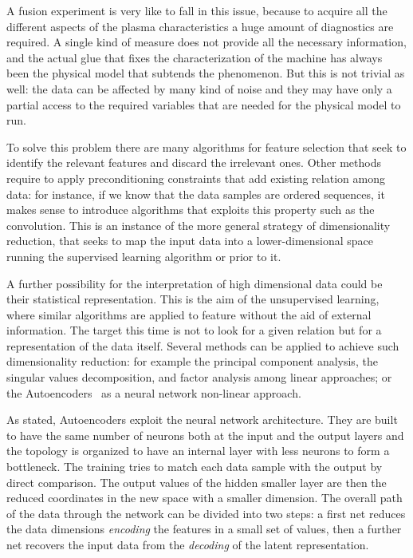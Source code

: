 A fusion experiment is very like to fall in this issue, because to acquire all the different aspects of the plasma characteristics a huge amount of diagnostics are required. A single kind of measure does not provide all the necessary information, and the actual glue that fixes the characterization of the machine has always been the physical model that subtends the phenomenon.
But this is not trivial as well: the data can be affected by many kind of noise and they may have only a partial access to the required variables that are needed for the physical model to run.

To solve this problem there are many algorithms for feature selection that seek to identify the relevant features and discard the irrelevant ones. 
Other methods require to apply preconditioning constraints that add existing relation among data: for instance, if we know that the data samples are ordered sequences, it makes sense to introduce algorithms that exploits this property such as the convolution.
This is an instance of the more general strategy of dimensionality reduction, that seeks to map the input data into a lower-dimensional space running the supervised learning algorithm or prior to it. 

A further possibility for the interpretation of high dimensional data could be their statistical representation.
This is the aim of the unsupervised learning, where similar algorithms are applied to feature without the aid of external information. The target this time is not to look for a given relation but for a representation of the data itself.
Several methods can be applied to achieve such dimensionality reduction: for example the principal component analysis, the singular values decomposition, and factor analysis among linear approaches; or the Autoencoders~\cite{Hinton504} as a neural network non-linear approach.

As stated, Autoencoders exploit the neural network architecture. They are built to have the same number of neurons both at the input and the output layers and the topology is organized to have an internal layer with less neurons to form a bottleneck. The training tries to match each data sample with the output by direct comparison.
The output values of the hidden smaller layer are then the reduced coordinates in the new space with a smaller dimension.
The overall path of the data through the network can be divided into two steps: a first net reduces the data dimensions \textit{encoding} the features in a small set of values, then a further net recovers the input data from the \textit{decoding} of the latent representation. 

